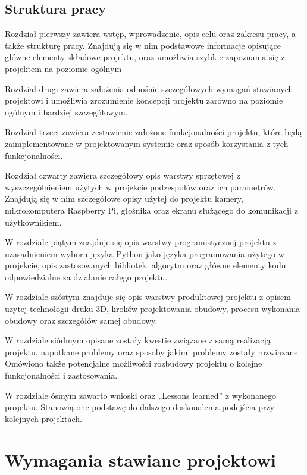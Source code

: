 \documentclass[a4paper,12pt,reqno]{article}
\begin{document}
\subsection{Struktura pracy} %

Rozdział pierwszy zawiera wstęp, wprowadzenie, opis celu oraz zakresu pracy, a także strukturę pracy. Znajdują się w nim podstawowe informacje opisujące główne elementy składowe projektu, oraz umożliwia szybkie zapoznania się z projektem na poziomie ogólnym

Rozdział drugi zawiera założenia odnośnie szczegółowych wymagań stawianych projektowi i umożliwia zrozumienie koncepcji projektu zarówno na poziomie ogólnym i bardziej szczegółowym.

Rozdział trzeci zawiera zestawienie założone funkcjonalności projektu, które będą zaimplementowane w projektowanym systemie oraz sposób korzystania z tych funkcjonalności.

Rozdział czwarty zawiera szczegółowy opis warstwy sprzętowej z wyszczególnieniem użytych w projekcie podzespołów oraz ich parametrów. Znajdują się w nim szczegółowe opisy użytej do projektu kamery, mikrokomputera Raspberry Pi, głośnika oraz ekranu służącego do komunikacji z użytkownikiem.

W rozdziale piątym znajduje się opis warstwy programistycznej projektu z uzasadnieniem wyboru języka Python jako języka programowania użytego w projekcie, opis zastosowanych bibliotek, algorytm oraz główne elementy kodu odpowiedzialne za działanie całego projektu.

W rozdziale szóstym znajduje się opis warstwy produktowej projektu z opisem użytej technologii druku 3D, kroków projektowania obudowy, procesu wykonania obudowy oraz szczegółów samej obudowy.

W rozdziale siódmym opisane zostały kwestie związane z samą realizacją projektu, napotkane problemy oraz sposoby jakimi problemy zostały rozwiązane. Omówiono także potencjalne możliwości rozbudowy projektu o kolejne funkcjonalności i zastosowania.

W rozdziale ósmym zawarto wnioski oraz „Lessons learned” z wykonanego projektu. Stanowią one podstawę do dalszego doskonalenia podejścia przy kolejnych projektach.

\newpage
\section{Wymagania stawiane projektowi} \label{section:wymagania}
\end{document}
